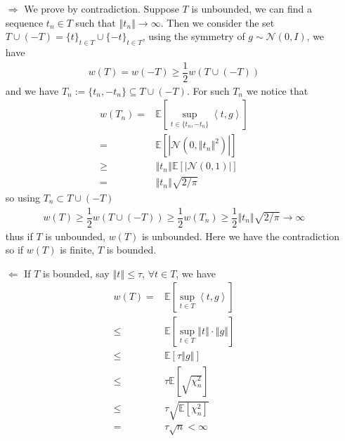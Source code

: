 \documentclass[11pt,a4paper]{ctexart}
\numberwithin{equation}{section}%
\begin{document}
\begin{itemize}[topsep=2pt,itemsep=0pt]
    \item[$  \Rightarrow  $] We prove by contradiction. Suppose $ T $ is unbounded, we can find a sequence $ t_n\in T $ such that $ \left\Vert t_n \right\Vert \to \infty $. Then we consider the set $ T\cup (-T) = \{t\}_{t\in T}\cup \{ -t \}_{t\in T} $, using the symmetry of $ g\sim \mathcal{N}(0,I) $, we have
    \begin{align*}
        w(T) = w(-T) \geq \dfrac{ 1 }{ 2 } w(T\cup (-T)) 
    \end{align*}
    and we have $ T_n:= \{t_n, -t_n\}\subseteq  T\cup (-T) $. For such $ T_n $ we notice that
    \begin{align*}
        w(T_n) = & \mathbb{E}\left[ \mathop{ \sup  }\limits_{t\in \{t_n, -t_n\} } \left\langle t,g  \right\rangle  \right] \\ 
        = & \mathbb{E}\left[ \left\vert \mathcal{N}(0, \left\Vert t_n  \right\Vert ^2) \right\vert  \right]\\
        \geq & \left\Vert t_n \right\Vert \mathbb{E}\left[ \left\vert \mathcal{N}(0,1) \right\vert  \right] \\
        =& \left\Vert t_n \right\Vert \sqrt{2/\pi}  
    \end{align*}
    so using $ T_n \subset T\cup (-T) $
    \begin{align*}
        w(T) \geq \dfrac{ 1 }{ 2 } w(T\cup (-T)) \geq \dfrac{ 1 }{ 2 } w(T_n) \geq \dfrac{ 1 }{ 2 } \left\Vert t_n \right\Vert \sqrt{2/\pi} \to \infty 
    \end{align*}
    thus if $ T $ is unbounded, $ w(T) $ is unbounded. Here we have the contradiction so if $ w(T) $ is finite, $ T $ is bounded.
    
    
    
    

    
    
    
    
    

    \item[$ \Leftarrow $] If $ T $ is bounded, say $ \left\Vert t  \right\Vert \leq \tau $, $ \forall t\in T $, we have
    \begin{align*}
        w(T) =& \mathbb{E}\left[ \mathop{ \sup  }\limits_{t\in T } \left\langle t,g  \right\rangle  \right]\\
        \leq & \mathbb{E}\left[ \mathop{ \sup  }\limits_{t \in T } \left\Vert t  \right\Vert \cdot \left\Vert g  \right\Vert  \right] \\
        \leq & \mathbb{E}\left[  \tau \left\Vert g \right\Vert  \right] \\
        \leq & \tau \mathbb{E}\left[ \sqrt{\chi^2_n} \right] \\
        \leq & \tau \sqrt{\mathbb{E}\left[ \chi^2_n  \right] }\\
        = & \tau \sqrt{n} < \infty
    \end{align*}
    

\end{itemize}
\end{document}
